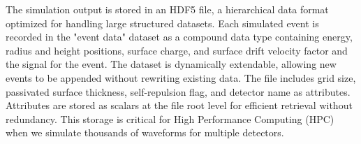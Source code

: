The simulation output is stored in an HDF5 file, a hierarchical data format optimized for handling large structured datasets. Each simulated event is recorded in the "event data" dataset as a compound data type containing energy, radius and height positions, surface charge, and surface drift velocity factor and the signal for the event. The dataset is dynamically extendable, allowing new events to be appended without rewriting existing data. The file includes grid size, passivated surface thickness, self-repulsion flag, and detector name as attributes. Attributes are stored as scalars at the file root level for efficient retrieval without redundancy. This storage is critical for High Performance Computing (HPC) when we simulate thousands of waveforms for multiple detectors.
 